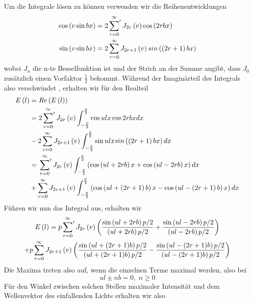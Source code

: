 Um die Integrale lösen zu können verwenden wir die Reihenentwicklungen
\begin{align}
 \cos \left( v \sin bx \right) & =  2 \sideset{}{'} \sum_{r=0}^{\infty} J_{2r} \left( v \right) \cos \left( 2rbx \right) \\
 \sin \left( v \sin bx \right) & =  2 \sum_{r=0}^{\infty} J_{2r+1} \left( v \right) sin \left( \left( 2r+1 \right) bx \right)
\end{align}
wobei $J_{n}$ die n-te Besselfunktion ist und der Strich an der Summe angibt, dass $J_{0}$ zusätzlich einen Vorfaktor $\frac{1}{2}$ bekommt. Während der Imaginärteil des Integrals also verschwindet \cite{Raman}, erhalten wir für den Realteil
\begin{align}
 E \left( l \right) &= Re \left( E \left( l \right) \right)\\
 & = 2 \sideset{}{'} \sum_{r=0}^{\infty} J_{2r} \left( v \right) \int_{-\frac{p}{2}}^{\frac{p}{2}} \cos ulx \cos 2rbx dx \nonumber \\
 &- 2 \sum_{r=0}^{\infty} J_{2r+1} \left( v \right) \int_{-\frac{p}{2}}^{\frac{p}{2}} \sin ulx sin \left( \left( 2r+1 \right) bx \right) dx\\
 &= \sideset{}{'} \sum_{r=0}^{\infty} J_{2r} \left( v \right) \int_{-\frac{p}{2}}^{\frac{p}{2}} \left( \cos \left( ul + 2rb \right)x + \cos \left( ul - 2rb \right)x \right) dx \nonumber \\
 &+ \sum_{r=0}^{\infty} J_{2r+1} \left( v \right) \int_{-\frac{p}{2}}^{\frac{p}{2}} \left( \cos \left( ul + \left(  2r+1 \right) b \right)x - \cos \left( ul - \left(  2r+1 \right) b \right)x  \right) dx
\end{align}
Führen wir nun das Integral aus, erhalten wir
\begin{multline}
 E \left( l \right) = p \sideset{}{'} \sum_{r=0}^{\infty} J_{2r} \left( v \right) \left( \frac{\sin \left(ul+2rb\right)p/2}{\left(ul+2rb\right)p/2} + \frac{\sin \left(ul-2rb\right)p/2}{\left(ul-2rb\right)p/2} \right) \\
 + p \sum_{r=0}^{\infty} J_{2r+1} \left( v \right) \left( \frac{\sin \left(ul+(2r+1)b\right)p/2}{\left(ul+(2r+1)b\right)p/2} - \frac{\sin \left(ul-(2r+1)b\right)p/2}{\left(ul-(2r+1)b\right)p/2} \right)
\end{multline}
Die Maxima treten also auf, wenn die einzelnen Terme maximal werden, also bei
\begin{equation}
 ul \pm nb = 0,\;  n \geq 0
\end{equation}
Für den Winkel zwischen solchen Stellen maximaler Intensität und dem Wellenvektor des einfallenden Lichts erhalten wir also
